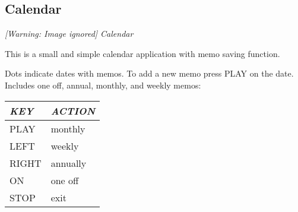 \subsection{Calendar}
{\centering\itshape
  [Warning: Image ignored] %
 \newline
Calendar
\par}

This is a small and simple calendar application with memo saving function.

Dots indicate dates with memos. To add a new memo press PLAY on the
date. Includes one off, annual, monthly, and weekly memos:

\begin{tabular}[c]{|p{2.6469998cm}|p{3.95cm}|}
\hline
{\centering\bfseries\itshape
KEY
\par}
&
{\centering\bfseries\itshape
ACTION
\par}
\\\hline
{\centering
PLAY
\par}
&
monthly
\\\hline
{\centering
LEFT
\par}
&
weekly
\\\hline
{\centering
RIGHT
\par}
&
annually 
\\\hline
{\centering
ON
\par}
&
one off
\\\hline
{\centering
STOP
\par}
&
exit 
\\\hline
\end{tabular}



